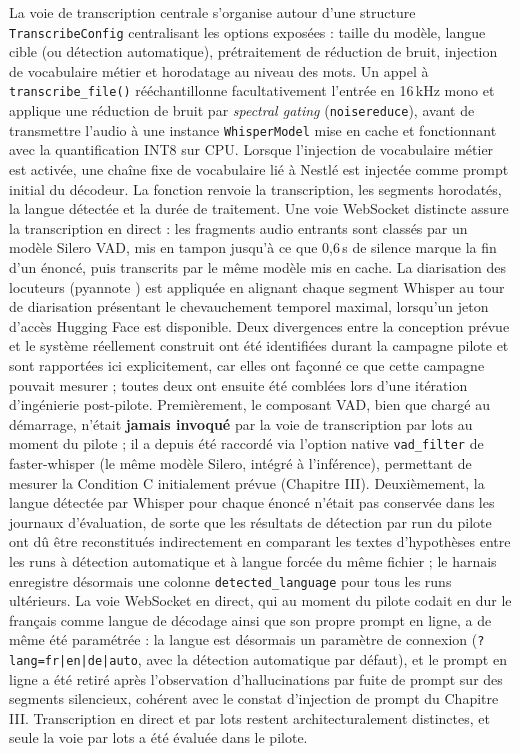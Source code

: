 \documentclass[12pt]{report}
\begin{document}
La voie de transcription centrale s'organise autour d'une structure \texttt{TranscribeConfig} centralisant les options exposées : taille du modèle, langue cible (ou détection automatique), prétraitement de réduction de bruit, injection de vocabulaire métier et horodatage au niveau des mots. Un appel à \texttt{transcribe\_file()} rééchantillonne facultativement l'entrée en 16\,kHz mono et applique une réduction de bruit par \textit{spectral gating} (\texttt{noisereduce}), avant de transmettre l'audio à une instance \texttt{WhisperModel} mise en cache et fonctionnant avec la quantification INT8 sur CPU. Lorsque l'injection de vocabulaire métier est activée, une chaîne fixe de vocabulaire lié à Nestl\'e est injectée comme prompt initial du décodeur. La fonction renvoie la transcription, les segments horodatés, la langue détectée et la durée de traitement. Une voie WebSocket distincte assure la transcription en direct : les fragments audio entrants sont classés par un modèle Silero VAD, mis en tampon jusqu'à ce que 0,6\,s de silence marque la fin d'un énoncé, puis transcrits par le même modèle mis en cache. La diarisation des locuteurs (pyannote \cite{bredin2020pyannote}) est appliquée en alignant chaque segment Whisper au tour de diarisation présentant le chevauchement temporel maximal, lorsqu'un jeton d'accès Hugging Face est disponible.
Deux divergences entre la conception prévue et le système réellement construit ont été identifiées durant la campagne pilote et sont rapportées ici explicitement, car elles ont façonné ce que cette campagne pouvait mesurer ; toutes deux ont ensuite été comblées lors d'une itération d'ingénierie post-pilote. Premièrement, le composant VAD, bien que chargé au démarrage, n'était \textbf{jamais invoqué} par la voie de transcription par lots au moment du pilote ; il a depuis été raccordé via l'option native \texttt{vad\_filter} de faster-whisper (le même modèle Silero, intégré à l'inférence), permettant de mesurer la Condition C initialement prévue (Chapitre III). Deuxièmement, la langue détectée par Whisper pour chaque énoncé n'était pas conservée dans les journaux d'évaluation, de sorte que les résultats de détection par run du pilote ont dû être reconstitués indirectement en comparant les textes d'hypothèses entre les runs à détection automatique et à langue forcée du même fichier ; le harnais enregistre désormais une colonne \texttt{detected\_language} pour tous les runs ultérieurs. La voie WebSocket en direct, qui au moment du pilote codait en dur le français comme langue de décodage ainsi que son propre prompt en ligne, a de même été paramétrée : la langue est désormais un paramètre de connexion (\texttt{?lang=fr|en|de|auto}, avec la détection automatique par défaut), et le prompt en ligne a été retiré après l'observation d'hallucinations par fuite de prompt sur des segments silencieux, cohérent avec le constat d'injection de prompt du Chapitre III. Transcription en direct et par lots restent architecturalement distinctes, et seule la voie par lots a été évaluée dans le pilote.
\end{document}

